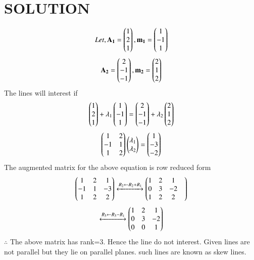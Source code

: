 \documentclass[journal,12pt,twocolumn]{IEEEtran}
\begin{document}
\section{SOLUTION}  
\begin{align}
Let,
\mathbf{A_1} = \begin{pmatrix}1 \\ 2 \\ 1\end{pmatrix} , \mathbf{m_1} = \begin{pmatrix}1 \\ -1 \\ 1\end{pmatrix}
\end{align}
\begin{align}
\mathbf{A_2} = \begin{pmatrix}2 \\ -1 \\ -1\end{pmatrix} , \mathbf{m_2} = \begin{pmatrix}2 \\ 1 \\ 2\end{pmatrix}
\end{align}
The lines will interest if 
\begin{align}
\begin{pmatrix}1 \\ 2 \\ 1\end{pmatrix} + \lambda_1\begin{pmatrix}1 \\ -1 \\ 1\end{pmatrix} = \begin{pmatrix}2 \\ -1 \\ -1\end{pmatrix} + \lambda_2\begin{pmatrix}2 \\ 1 \\ 2\end{pmatrix}
\end{align}
\begin{align}
\begin{pmatrix}1 & 2\\ -1 & 1 \\ 1 & 2\end{pmatrix}\begin{pmatrix}\lambda_1 \\ \lambda_2\end{pmatrix} = \begin{pmatrix}1 \\ -3  \\ -2 \end{pmatrix}
\end{align}
The augmented matrix for the above equation is row reduced form
\begin{align}
\begin{pmatrix}1 & 2 & 1\\-1 & 1 & -3 \\ 1 & 2 & 2\end{pmatrix} 
\xleftrightarrow {R_2\leftarrow R_2 +R_1}\begin{pmatrix}1 & 2 & 1 & \\0 & 3 & -2 \\1 & 2 & 2 \end{pmatrix}
\end{align}
\begin{align}
\xleftrightarrow {R_3\leftarrow R_3 - R_1}\begin{pmatrix}1 & 2 & 1 \\ 0 & 3 & -2 \\ 0 & 0 & 1\end{pmatrix}
\end{align}
$\therefore$ The above matrix has rank=3. Hence the line do not interest. Given lines are not parallel but they lie on parallel planes. such lines are known as skew lines.
\end{document}
